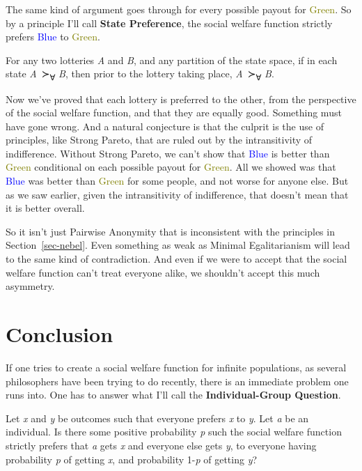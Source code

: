 \documentclass[
  11pt,
  letterpaper,
  DIV=11,
  numbers=noendperiod,
  twoside]{scrartcl}
\providecommand{\tightlist}{%
  \setlength{\itemsep}{0pt}\setlength{\parskip}{0pt}}
\begin{document}
The same kind of argument goes through for every possible payout for
\textcolor{olive}{Green}. So by a principle I'll call \textbf{State
Preference}, the social welfare function strictly prefers
\textcolor{blue}{Blue} to \textcolor{olive}{Green}.

\begin{description}
\tightlist
\item[State Preference]
For any two lotteries \emph{A} and \emph{B}, and any partition of the
state space, if in each state \emph{A}~≻\textsubscript{∀} \emph{B}, then
prior to the lottery taking place, \emph{A}~≻\textsubscript{∀} \emph{B}.
\end{description}

Now we've proved that each lottery is preferred to the other, from the
perspective of the social welfare function, and that they are equally
good. Something must have gone wrong. And a natural conjecture is that
the culprit is the use of principles, like Strong Pareto, that are ruled
out by the intransitivity of indifference. Without Strong Pareto, we
can't show that \textcolor{blue}{Blue} is better than
\textcolor{olive}{Green} conditional on each possible payout for
\textcolor{olive}{Green}. All we showed was that \textcolor{blue}{Blue}
was better than \textcolor{olive}{Green} for some people, and not worse
for anyone else. But as we saw earlier, given the intransitivity of
indifference, that doesn't mean that it is better overall.

So it isn't just Pairwise Anonymity that is inconsistent with the
principles in Section~\ref{sec-nebel}. Even something as weak as Minimal
Egalitarianism will lead to the same kind of contradiction. And even if
we were to accept that the social welfare function can't treat everyone
alike, we shouldn't accept this much asymmetry.

\section{Conclusion}\label{sec-conclusion}

If one tries to create a social welfare function for infinite
populations, as several philosophers have been trying to do recently,
there is an immediate problem one runs into. One has to answer what I'll
call the \textbf{Individual-Group Question}.

\begin{description}
\tightlist
\item[Individual-Group Question]
Let \emph{x} and \emph{y} be outcomes such that everyone prefers
\emph{x} to \emph{y}. Let \emph{a} be an individual. Is there some
positive probability \emph{p} such the social welfare function strictly
prefers that \emph{a} gets \emph{x} and everyone else gets \emph{y}, to
everyone having probability \emph{p} of getting \emph{x}, and
probability 1-\emph{p} of getting \emph{y}?
\end{description}
\end{document}
